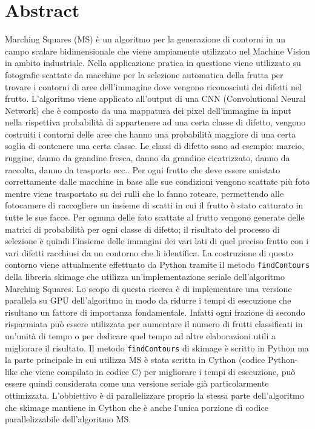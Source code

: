 \documentclass[12pt,a4paper]{report}
\begin{document}
\chapter{Abstract}
Marching Squares (MS) è un algoritmo per la generazione di contorni in un campo scalare bidimensionale che viene ampiamente utilizzato nel Machine Vision in ambito industriale. Nella applicazione pratica in questione viene utilizzato su fotografie scattate da macchine per la selezione automatica della frutta per trovare i contorni di aree dell'immagine dove vengono riconosciuti dei difetti nel frutto. L'algoritmo viene applicato all'output di una CNN (Convolutional Neural Network) che è composto da una mappatura dei pixel dell'immagine in input nella rispettiva probabilità di appartenere ad una certa classe di difetto, vengono costruiti i contorni delle aree che hanno una probabilità maggiore di una certa soglia di contenere una certa classe. Le classi di difetto sono ad esempio: marcio, ruggine, danno da grandine fresca, danno da grandine cicatrizzato, danno da raccolta, danno da trasporto ecc.. \newline
Per ogni frutto che deve essere smistato correttamente dalle macchine in base alle sue condizioni vengono scattate più foto mentre viene trasportato su dei rulli che lo fanno roteare, permettendo alle fotocamere di raccogliere un insieme di scatti in cui il frutto è stato catturato in tutte le sue facce. Per ognuna delle foto scattate al frutto vengono generate delle matrici di probabilità per ogni classe di difetto; il risultato del processo di selezione è quindi l'insieme delle immagini dei vari lati di quel preciso frutto con i vari difetti racchiusi da un contorno che li identifica. \newline 
La costruzione di questo contorno viene attualmente effettuato da Python tramite il metodo \verb|findContours| della libreria skimage che utilizza un'implementazione seriale dell'algoritmo Marching Squares. Lo scopo di questa ricerca è di implementare una versione parallela su GPU dell'algoritmo in modo da ridurre i tempi di esecuzione che risultano un fattore di importanza fondamentale.  Infatti ogni frazione di secondo risparmiata può essere utilizzata per aumentare il numero di frutti classificati in un'unità di tempo o per dedicare quel tempo ad altre elaborazioni utili a migliorare il risultato. 
Il metodo \verb|findContours| di skimage è scritto in Python ma la parte principale in cui utilizza MS è stata scritta in Cython (codice Python-like che viene compilato in codice C) per migliorare i tempi di esecuzione, può essere quindi considerata come una versione seriale già particolarmente ottimizzata. \newline L'obbiettivo è di parallelizzare proprio la stessa parte dell'algoritmo che skimage mantiene in Cython che è anche l'unica porzione di codice parallelizzabile dell'algoritmo MS. \newline
\end{document}
